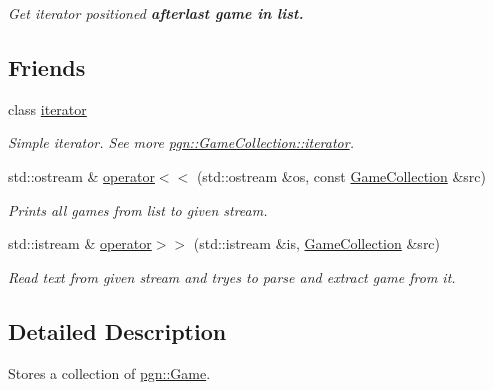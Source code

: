 \begin{DoxyCompactItemize}
\begin{DoxyCompactList}\small\item\em Get iterator positioned {\bfseries after{\bfseries  last game in list. }}\item\end{DoxyCompactList}\end{DoxyCompactItemize}
\subsection*{Friends}
\begin{DoxyCompactItemize}
\item 
\hypertarget{classpgn_1_1GameCollection_a67171474c4da6cc8efe0c7fafefd2b2d}{
class \hyperlink{classpgn_1_1GameCollection_a67171474c4da6cc8efe0c7fafefd2b2d}{iterator}}
\label{classpgn_1_1GameCollection_a67171474c4da6cc8efe0c7fafefd2b2d}

\begin{DoxyCompactList}\small\item\em Simple iterator. See more \hyperlink{classpgn_1_1GameCollection_1_1iterator}{pgn::GameCollection::iterator}. \item\end{DoxyCompactList}\item 
std::ostream \& \hyperlink{classpgn_1_1GameCollection_ac258d4cb6213285224df408f9f83e2d5}{operator$<$$<$} (std::ostream \&os, const \hyperlink{classpgn_1_1GameCollection}{GameCollection} \&src)
\begin{DoxyCompactList}\small\item\em Prints all games from list to given stream. \item\end{DoxyCompactList}\item 
std::istream \& \hyperlink{classpgn_1_1GameCollection_a7e46f87a4a75517b499310e60526ea04}{operator$>$$>$} (std::istream \&is, \hyperlink{classpgn_1_1GameCollection}{GameCollection} \&src)
\begin{DoxyCompactList}\small\item\em Read text from given stream and tryes to parse and extract game from it. \item\end{DoxyCompactList}\end{DoxyCompactItemize}


\subsection{Detailed Description}
Stores a collection of \hyperlink{classpgn_1_1Game}{pgn::Game}. 

